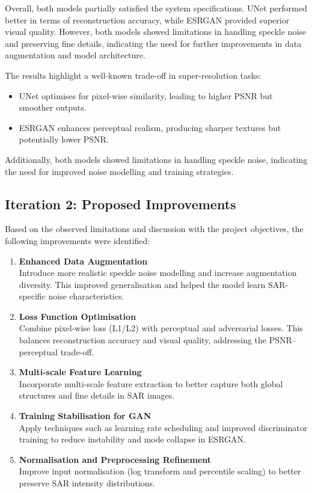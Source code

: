 \documentclass[conference]{IEEEtran}
\begin{document}
Overall, both models partially satisfied the system specifications. UNet performed better in terms of reconstruction accuracy, while ESRGAN provided superior visual quality. However, both models showed limitations in handling speckle noise and preserving fine details, indicating the need for further improvements in data augmentation and model architecture.

The results highlight a well-known trade-off in super-resolution tasks:

\begin{itemize}
    \item UNet optimises for pixel-wise similarity, leading to higher PSNR but smoother outputs.
    \item ESRGAN enhances perceptual realism, producing sharper textures but potentially lower PSNR.
\end{itemize}

Additionally, both models showed limitations in handling speckle noise, indicating the need for improved noise modelling and training strategies.

\subsection{Iteration 2: Proposed Improvements}

Based on the observed limitations and discussion with the project objectives, the following improvements were identified:

\begin{enumerate}
    \item \textbf{Enhanced Data Augmentation} \\
    Introduce more realistic speckle noise modelling and increase augmentation diversity. This improved generalisation and helped the model learn SAR-specific noise characteristics.

    \item \textbf{Loss Function Optimisation} \\
    Combine pixel-wise loss (L1/L2) with perceptual and adversarial losses. This balances reconstruction accuracy and visual quality, addressing the PSNR–perceptual trade-off.

    \item \textbf{Multi-scale Feature Learning} \\
    Incorporate multi-scale feature extraction to better capture both global structures and fine details in SAR images.

    \item \textbf{Training Stabilisation for GAN} \\
    Apply techniques such as learning rate scheduling and improved discriminator training to reduce instability and mode collapse in ESRGAN\@.

    \item \textbf{Normalisation and Preprocessing Refinement} \\
    Improve input normalisation (log transform and percentile scaling) to better preserve SAR intensity distributions.
\end{enumerate}
\end{document}
